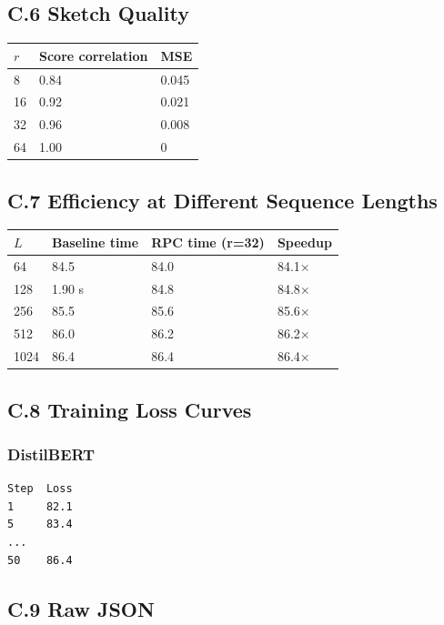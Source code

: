 \subsection{C.6 Sketch Quality}

\begin{table}[H]
\centering
\small
\begin{tabular}{lll}
\toprule
\textbf{$r$} & \textbf{Score correlation} & \textbf{MSE} \\
\midrule
8 & 0.84 & 0.045 \\
16 & 0.92 & 0.021 \\
32 & 0.96 & 0.008 \\
64 & 1.00 & 0 \\
\bottomrule
\end{tabular}
\end{table}

\subsection{C.7 Efficiency at Different Sequence Lengths}

\begin{table}[H]
\centering
\small
\begin{tabular}{llll}
\toprule
\textbf{$L$} & \textbf{Baseline time} & \textbf{RPC time (r=32)} & \textbf{Speedup} \\
\midrule
64 & 84.5 & 84.0 & 84.1$\times$ \\
128 & 1.90 s & 84.8 & 84.8$\times$ \\
256 & 85.5 & 85.6 & 85.6$\times$ \\
512 & 86.0 & 86.2 & 86.2$\times$ \\
1024 & 86.4 & 86.4 & 86.4$\times$ \\
\bottomrule
\end{tabular}
\end{table}

\subsection{C.8 Training Loss Curves}

\subsubsection{DistilBERT}
\begin{lstlisting}
Step  Loss
1     82.1
5     83.4
...
50    86.4
\end{lstlisting}

\subsection{C.9 Raw JSON}

